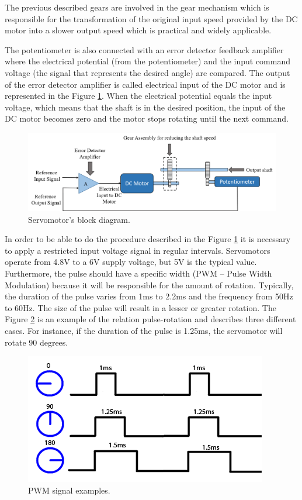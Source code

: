 The previous described gears are involved in the gear mechanism which is responsible for the transformation of the original input speed provided by the DC motor into a slower output speed which is practical and widely applicable. 

The potentiometer is also connected with an error detector feedback amplifier where the electrical potential (from the potentiometer) and the input command voltage (the signal that represents the desired angle) are compared. The output of the error detector amplifier is called electrical input of the DC motor and is represented in the Figure \ref{servomotor_expl3}. When the electrical potential equals the input voltage, which means that the shaft is in the desired position, the input of the DC motor becomes zero and the motor stops rotating until the next command.

\begin{figure}[H]
\centerline{
\includegraphics[scale=0.6]{figures/servomotor_expl3new.png}}
\caption{Servomotor’s block diagram.}
\label{servomotor_expl3}
\end{figure}

In order to be able to do the procedure described in the Figure \ref{servomotor_expl3} it is necessary to apply a restricted input voltage signal in regular intervals. Servomotors operate from 4.8V to a 6V supply voltage, but 5V is the typical value. Furthermore, the pulse should have a specific width (PWM – Pulse Width Modulation) because it will be responsible for the amount of rotation. Typically, the duration of the pulse varies from 1ms to 2.2ms and the frequency from 50Hz to 60Hz. The size of the pulse will result in a lesser or greater rotation. The Figure \ref{signal_servo} is an example of the relation pulse-rotation and describes three different cases. For instance, if the duration of the pulse is 1.25ms, the servomotor will rotate 90 degrees.

\begin{figure}[H]
\centering
\includegraphics[scale=0.5]{figures/signal_servo.jpg}
\caption{PWM signal examples.}
\label{signal_servo}
\end{figure}


